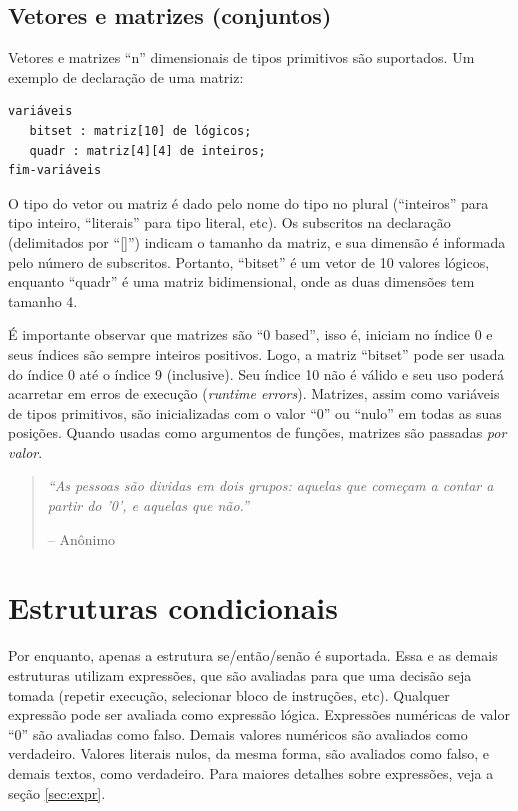 \documentclass[a4paper,11pt]{report}
\begin{document}
\subsection{Vetores e matrizes (conjuntos)}

Vetores e matrizes ``n'' dimensionais de tipos primitivos são suportados. Um
exemplo de declaração de uma matriz:

\begin{verbatim}
variáveis
   bitset : matriz[10] de lógicos;
   quadr : matriz[4][4] de inteiros;
fim-variáveis
\end{verbatim}

O tipo do vetor ou matriz é dado pelo nome do tipo no plural (``inteiros'' para
tipo inteiro, ``literais'' para tipo literal, etc). Os subscritos na declaração
(delimitados por ``[]'') indicam o tamanho da matriz, e sua dimensão é informada
pelo número de subscritos. Portanto, ``bitset'' é um vetor de 10 valores
lógicos, enquanto ``quadr'' é uma matriz bidimensional, onde as duas dimensões
tem tamanho 4.

É importante observar que matrizes são ``0 based'', isso é, iniciam no índice 0
e seus índices são sempre inteiros positivos. Logo, a matriz ``bitset'' pode ser
usada do índice 0 até o índice 9 (inclusive). Seu índice 10 não é válido e seu
uso poderá acarretar em erros de execução (\textit{runtime errors}). Matrizes,
assim como variáveis de tipos primitivos, são inicializadas com o valor ``0'' ou
``nulo'' em todas as suas posições. Quando usadas como argumentos de funções,
matrizes são passadas \textit{por valor}.

\begin{quotation}
  \textit{``As pessoas são dividas em dois grupos: aquelas que começam a contar
  a partir do '0', e aquelas que não.''}
   \begin{flushright}
  -- Anônimo
  \end{flushright}
\end{quotation}

\section{Estruturas condicionais}

Por enquanto, apenas a estrutura se/então/senão é suportada. Essa e as demais
estruturas utilizam expressões, que são avaliadas para que uma decisão seja
tomada (repetir execução, selecionar bloco de instruções, etc). Qualquer
expressão pode ser avaliada como expressão lógica. Expressões numéricas de valor
``0'' são avaliadas como falso. Demais valores numéricos são avaliados como
verdadeiro. Valores literais nulos, da mesma forma, são avaliados como falso, e
demais textos, como verdadeiro. Para maiores detalhes sobre expressões, veja a
seção \ref{sec:expr}.
\end{document}
